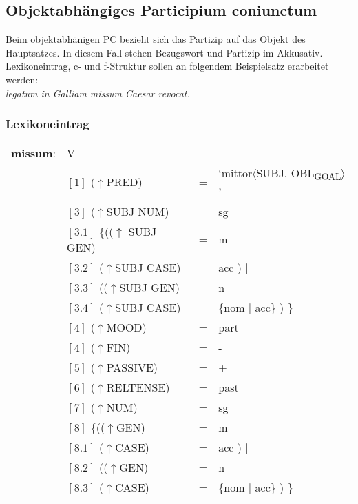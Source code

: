 \documentclass[12pt,a4paper]{article}
\begin{document}
\subsection{Objektabhängiges Participium coniunctum}
Beim objektabhänigen PC bezieht sich das Partizip auf das Objekt des Hauptsatzes. In diesem Fall stehen Bezugswort und Partizip im Akkusativ. \\
Lexikoneintrag, c- und f-Struktur sollen an folgendem Beispielsatz erarbeitet werden: \\
\textit{legatum in Galliam missum Caesar revocat.}
\subsubsection{Lexikoneintrag}
\begin{singlespace}
\begin{tabular}{ l  l  l  l  } 
\textbf{missum}: & V \\
$\qquad$ & $[1]$ \:  ($\uparrow$PRED) & = & `mittor$\langle$SUBJ, OBL\textsubscript{GOAL}$\rangle$'\\
$\qquad$ & $[3]$ \:  ($\uparrow$SUBJ NUM) & =  & sg \\
$\qquad$ & $[3.1]$ \:  \{(($\uparrow$ SUBJ GEN) & = & m \\ 
$\qquad$ & $[3.2]$ \:  ($\uparrow$SUBJ CASE) & = & acc ) $\mid$\\
$\qquad$ & $[3.3]$ \: (($\uparrow$SUBJ GEN) & = & n \\
$\qquad$ & $[3.4]$ \:  ($\uparrow$SUBJ CASE) & = & \{nom $\mid$ acc\} ) \}\\
$\qquad$ & $[4]$ \:  ($\uparrow$MOOD) & = & part\\
$\qquad$ & $[4]$ \:  ($\uparrow$FIN) & = & - \\
$\qquad$ & $[5]$ \:  ($\uparrow$PASSIVE) & = & + \\
$\qquad$ & $[6]$ \:  ($\uparrow$RELTENSE) & = & past \\
$\qquad$ & $[7]$ \:  ($\uparrow$NUM) & = & sg \\
$\qquad$ & $[8]$ \:  \{(($\uparrow$GEN) & = & m \\ 
$\qquad$ & $[8.1]$ \:  ($\uparrow$CASE) & = & acc ) $\mid$\\
$\qquad$ & $[8.2]$ \: (($\uparrow$GEN) & = & n \\
$\qquad$ & $[8.3]$ \:  ($\uparrow$CASE) & = & \{nom $\mid$ acc\} ) \}\\
\end{tabular}
\newline
\newline
\end{singlespace}
\end{document}
